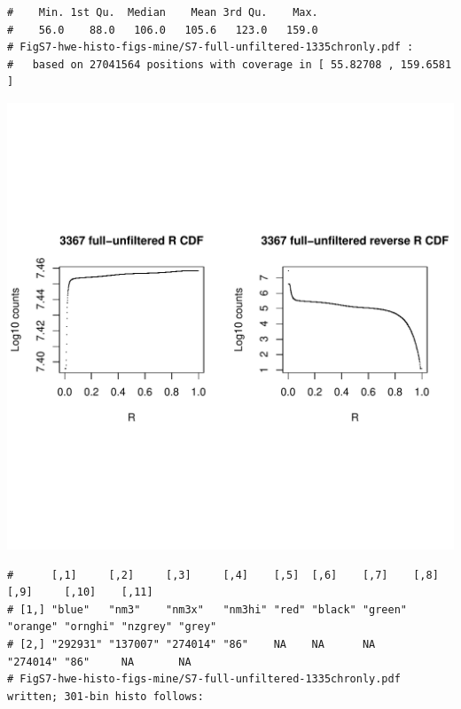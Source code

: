 \documentclass{article}\usepackage[]{graphicx}\usepackage[]{color}
\makeatletter
\def\maxwidth{ %
  \ifdim\Gin@nat@width>\linewidth
    \linewidth
  \else
    \Gin@nat@width
  \fi
}
\newenvironment{kframe}{%
 \def\at@end@of@kframe{}%
 \ifinner\ifhmode%
  \def\at@end@of@kframe{\end{minipage}}%
  \begin{minipage}{\columnwidth}%
 \fi\fi%
 \def\FrameCommand##1{\hskip\@totalleftmargin \hskip-\fboxsep
 \colorbox{shadecolor}{##1}\hskip-\fboxsep
     \hskip-\linewidth \hskip-\@totalleftmargin \hskip\columnwidth}%
 \MakeFramed {\advance\hsize-\width
   \@totalleftmargin\z@ \linewidth\hsize
   \@setminipage}}%
 {\par\unskip\endMakeFramed%
 \at@end@of@kframe}
\newenvironment{knitrout}{}{} %
\makeatother
\begin{document}
\begin{knitrout}
\begin{kframe}
\begin{verbatim}
#    Min. 1st Qu.  Median    Mean 3rd Qu.    Max. 
#    56.0    88.0   106.0   105.6   123.0   159.0 
# FigS7-hwe-histo-figs-mine/S7-full-unfiltered-1335chronly.pdf :
#   based on 27041564 positions with coverage in [ 55.82708 , 159.6581 ]
\end{verbatim}
\end{kframe}
\includegraphics[width=\maxwidth]{FigS7-hwe-histo-figs-knitr/unnamed-chunk-10-12} 
\begin{kframe}\begin{verbatim}
#      [,1]     [,2]     [,3]     [,4]    [,5]  [,6]    [,7]    [,8]     [,9]     [,10]    [,11] 
# [1,] "blue"   "nm3"    "nm3x"   "nm3hi" "red" "black" "green" "orange" "ornghi" "nzgrey" "grey"
# [2,] "292931" "137007" "274014" "86"    NA    NA      NA      "274014" "86"     NA       NA    
# FigS7-hwe-histo-figs-mine/S7-full-unfiltered-1335chronly.pdf written; 301-bin histo follows:
\end{verbatim}
\end{kframe}

\end{knitrout}
\end{document}
